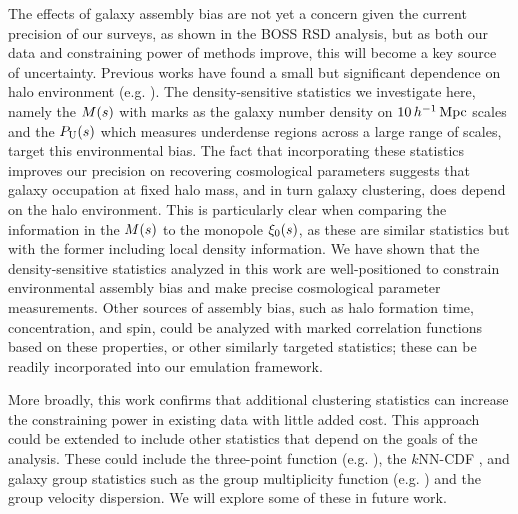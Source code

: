 The effects of galaxy assembly bias are not yet a concern given the current precision of our surveys, as shown in the \cite{Zhai2022} BOSS RSD analysis, but as both our data and constraining power of methods improve, this will become a key source of uncertainty.
Previous works have found a small but significant dependence on halo environment (e.g. \citealt{Zehavi2018, Yuan2021}).
The density-sensitive statistics we investigate here, namely the $M(s)$ with marks as the galaxy number density on $10 \, h^{-1}\,\mathrm{Mpc}$ scales and the $P_\mathrm{U}(s)$ which measures underdense regions across a large range of scales, target this environmental bias.
The fact that incorporating these statistics improves our precision on recovering cosmological parameters suggests that galaxy occupation at fixed halo mass, and in turn galaxy clustering, does depend on the halo environment.
This is particularly clear when comparing the information in the $M(s)$ to the monopole $\xi_0(s)$, as these are similar statistics but with the former including local density information. 
We have shown that the density-sensitive statistics analyzed in this work are well-positioned to constrain environmental assembly bias and make precise cosmological parameter measurements.
Other sources of assembly bias, such as halo formation time, concentration, and spin, could be analyzed with marked correlation functions based on these properties, or other similarly targeted statistics; these can be readily incorporated into our emulation framework.

More broadly, this work confirms that additional clustering statistics can increase the constraining power in existing data with little added cost.
This approach could be extended to include other statistics that depend on the goals of the analysis.
These could include the three-point function (e.g. \citealt{TakadaJain2003, McBride2011}), the $k$NN-CDF \citep{Banerjee2021a}, and galaxy group statistics such as the group multiplicity function (e.g. \citealt{BerlindWeinberg2002}) and the group velocity dispersion.
We will explore some of these in future work.

